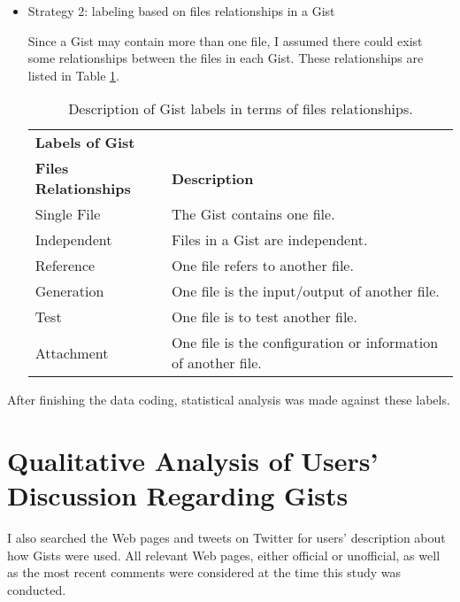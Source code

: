\begin{itemize}
  \item Strategy 2: labeling based on files relationships in a Gist

  Since a Gist may contain more than one file, I assumed there could exist some relationships between the files in each Gist. These relationships are listed in Table \ref{tb:gistfilerelationshiplabels}.

\begin{table}[!htb]
 \begin{center}
 \begin{tabular}{ll} 
    \textbf{Labels of Gist}	&	\\ 
    \textbf{Files Relationships}	& \textbf{Description}	\\  \hline
    Single File & The Gist contains one file.\\
    Independent & Files in a Gist are independent.\\
    Reference & One file refers to another file.\\ 
    Generation & One file is the input/output of another file.\\ 
    Test & One file is to test another file.\\ 
    Attachment & One file is the configuration or information of another file.\\ \hline
 \end{tabular}
 \end{center}
 \caption{Description of Gist labels in terms of files relationships.}
 \label{tb:gistfilerelationshiplabels}
\end{table}

\end{itemize}

After finishing the data coding, statistical analysis was made against these labels.

\section{Qualitative Analysis of Users' Discussion Regarding Gists}

I also searched the Web pages and tweets on Twitter for users' description about how Gists were used. All relevant Web pages, either official or unofficial, as well as the most recent comments were considered at the time this study was conducted. 

